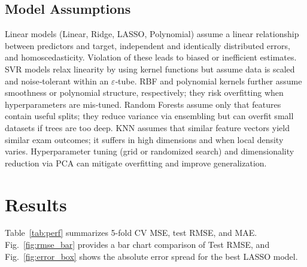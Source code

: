 \documentclass[conference]{IEEEtran}
\begin{document}
\subsection{Model Assumptions}
Linear models (Linear, Ridge, LASSO, Polynomial) assume a linear relationship between predictors and target, independent and identically distributed errors, and homoscedasticity. Violation of these leads to biased or inefficient estimates. SVR models relax linearity by using kernel functions but assume data is scaled and noise‐tolerant within an $\varepsilon$‐tube. RBF and polynomial kernels further assume smoothness or polynomial structure, respectively; they risk overfitting when hyperparameters are mis‐tuned. Random Forests assume only that features contain useful splits; they reduce variance via ensembling but can overfit small datasets if trees are too deep. KNN assumes that similar feature vectors yield similar exam outcomes; it suffers in high dimensions and when local density varies. Hyperparameter tuning (grid or randomized search) and dimensionality reduction via PCA can mitigate overfitting and improve generalization.

\section{Results}
Table~\ref{tab:perf} summarizes 5-fold CV MSE, test RMSE, and MAE.  
Fig.~\ref{fig:rmse_bar} provides a bar chart comparison of Test RMSE, and Fig.~\ref{fig:error_box} shows the absolute error spread for the best LASSO model.
\end{document}
